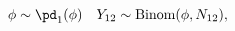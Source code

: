 \begin{equation}
  \phi \sim \pd_{1}(\phi) \quad
  Y_{12} \sim \text{Binom}(\phi, N_{12}),
  \label{eqn:study-12-submodel}
\end{equation}